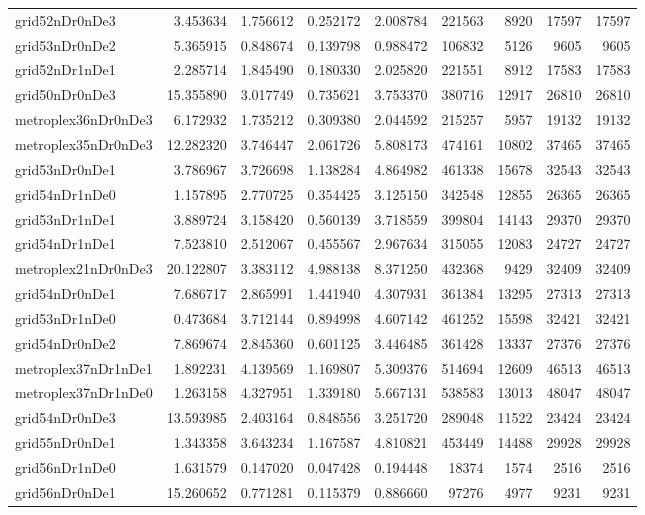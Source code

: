 \begin{longtable}{|l|r|r|r|r|r|r|r|r|}
grid52nDr0nDe3 & 3.453634 & 1.756612 & 0.252172 & 2.008784 & 221563 & 8920 & 17597 & 17597 \\
grid53nDr0nDe2 & 5.365915 & 0.848674 & 0.139798 & 0.988472 & 106832 & 5126 & 9605 & 9605 \\
grid52nDr1nDe1 & 2.285714 & 1.845490 & 0.180330 & 2.025820 & 221551 & 8912 & 17583 & 17583 \\
grid50nDr0nDe3 & 15.355890 & 3.017749 & 0.735621 & 3.753370 & 380716 & 12917 & 26810 & 26810 \\
metroplex36nDr0nDe3 & 6.172932 & 1.735212 & 0.309380 & 2.044592 & 215257 & 5957 & 19132 & 19132 \\
metroplex35nDr0nDe3 & 12.282320 & 3.746447 & 2.061726 & 5.808173 & 474161 & 10802 & 37465 & 37465 \\
grid53nDr0nDe1 & 3.786967 & 3.726698 & 1.138284 & 4.864982 & 461338 & 15678 & 32543 & 32543 \\
grid54nDr1nDe0 & 1.157895 & 2.770725 & 0.354425 & 3.125150 & 342548 & 12855 & 26365 & 26365 \\
grid53nDr1nDe1 & 3.889724 & 3.158420 & 0.560139 & 3.718559 & 399804 & 14143 & 29370 & 29370 \\
grid54nDr1nDe1 & 7.523810 & 2.512067 & 0.455567 & 2.967634 & 315055 & 12083 & 24727 & 24727 \\
metroplex21nDr0nDe3 & 20.122807 & 3.383112 & 4.988138 & 8.371250 & 432368 & 9429 & 32409 & 32409 \\
grid54nDr0nDe1 & 7.686717 & 2.865991 & 1.441940 & 4.307931 & 361384 & 13295 & 27313 & 27313 \\
grid53nDr1nDe0 & 0.473684 & 3.712144 & 0.894998 & 4.607142 & 461252 & 15598 & 32421 & 32421 \\
grid54nDr0nDe2 & 7.869674 & 2.845360 & 0.601125 & 3.446485 & 361428 & 13337 & 27376 & 27376 \\
metroplex37nDr1nDe1 & 1.892231 & 4.139569 & 1.169807 & 5.309376 & 514694 & 12609 & 46513 & 46513 \\
metroplex37nDr1nDe0 & 1.263158 & 4.327951 & 1.339180 & 5.667131 & 538583 & 13013 & 48047 & 48047 \\
grid54nDr0nDe3 & 13.593985 & 2.403164 & 0.848556 & 3.251720 & 289048 & 11522 & 23424 & 23424 \\
grid55nDr0nDe1 & 1.343358 & 3.643234 & 1.167587 & 4.810821 & 453449 & 14488 & 29928 & 29928 \\
grid56nDr1nDe0 & 1.631579 & 0.147020 & 0.047428 & 0.194448 & 18374 & 1574 & 2516 & 2516 \\
grid56nDr0nDe1 & 15.260652 & 0.771281 & 0.115379 & 0.886660 & 97276 & 4977 & 9231 & 9231 \\

\end{longtable}

